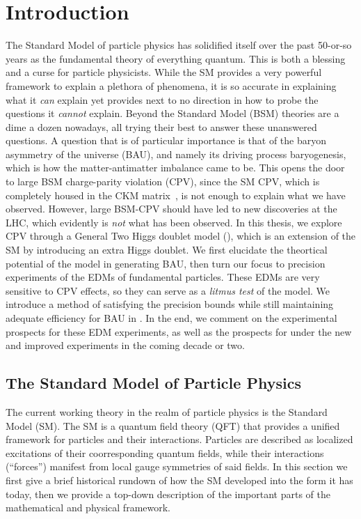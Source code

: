 \chapter{Introduction}
\label{ch:intro}

The Standard Model of particle physics has solidified itself over the past 50-or-so years as the fundamental theory of everything quantum.
This is both a blessing and a curse for particle physicists. 
While the SM provides a very powerful framework to explain a plethora of phenomena, 
it is so accurate in explaining what it \emph{can} explain 
yet provides next to no direction in how to probe the questions it \emph{cannot} explain.
Beyond the Standard Model (BSM) theories are a dime a dozen nowadays, 
all trying their best to answer these unanswered questions.
A question that is of particular importance is that of the baryon asymmetry of the universe (BAU),
and namely its driving process baryogenesis,
which is how the matter-antimatter imbalance came to be.
This opens the door to large BSM charge-parity violation (CPV),
since the SM CPV, which is completely housed in the CKM matrix~\cite{PDG2022},
is not enough to explain what we have observed.
However, large BSM-CPV should have led to new discoveries at the LHC, which evidently is \textit{not} what has been observed.
In this thesis, we explore CPV through a General Two Higgs doublet model ({\gthdm}), 
which is an extension of the SM by introducing an extra Higgs doublet.
We first elucidate the theortical potential of the model in generating BAU,
then turn our focus to precision experiments of the EDMs of fundamental particles.
These EDMs are very sensitive to CPV effects, so they can serve as a \emph{litmus test} of the model.
We introduce a method of satisfying the precision bounds while still maintaining adequate efficiency for BAU in {\gthdm}.
In the end, we comment on the experimental prospects for these EDM experiments,
as well as the prospects for {\gthdm} under the new and improved experiments in the coming decade or two.

\section{The Standard Model of Particle Physics}
The current working theory in the realm of particle physics is the Standard Model (SM). 
The SM is a quantum field theory (QFT) that provides a unified framework for particles and their interactions.
Particles are described as localized excitations of their coorresponding quantum fields,
while their interactions (``forces'') manifest from local gauge symmetries of said fields.
In this section we first give a brief historical rundown of how the SM developed into the form it has today,
then we provide a top-down description of the important parts of the mathematical and physical framework.

